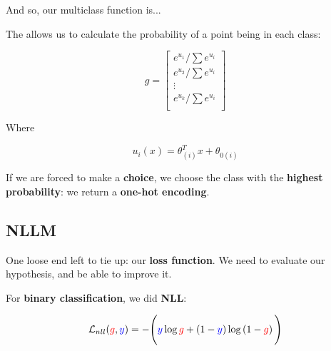         
        
        And so, our multiclass function is...\\
        
        \begin{definition}
            The  allows us to calculate the probability of a point being in each class:
            
            \begin{equation*}
                g = 
                \begin{bmatrix}
                    e^{u_1}/\sum e^{u_i}  \\
                    e^{u_2}/\sum e^{u_i}  \\
                    \vdots  \\
                    e^{u_k}/\sum e^{u_i}  \\
                \end{bmatrix}
            \end{equation*}
            
            Where
            
            \begin{equation}
                u_i(x) = \theta_{(i)}^T x + \theta_{0(i)}
            \end{equation}
        \end{definition}
        
        
        If we are forced to make a \textbf{choice}, we choose the class with the \textbf{highest probability}: we return a \textbf{one-hot encoding}.
    
    \subsection{NLLM}
    
        One loose end left to tie up: our \textbf{loss function}. We need to evaluate our hypothesis, and be able to improve it.
        
        For \textbf{binary classification}, we did \textbf{NLL}:
    
        \begin{equation*}
            \mathcal{L}_{nll}
            (\textcolor{red}{g} , \textcolor{blue}{y})
            =
            -
            \Bigg(
                \textcolor{blue}{y} \log{\textcolor{red}{g}}
                +
                \left( 1 - \textcolor{blue}{y} \right)
                \log
                \left( 1-\textcolor{red}{g} \right) 
            \Bigg)
        \end{equation*}
        
